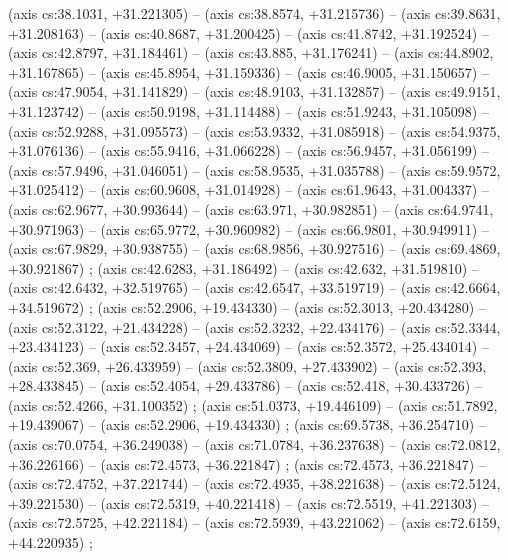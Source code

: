     (axis cs:38.1031,    +31.221305) --  (axis cs:38.8574,    +31.215736) --  (axis cs:39.8631,    +31.208163) --  (axis cs:40.8687,    +31.200425) --  (axis cs:41.8742,    +31.192524) --  (axis cs:42.8797,    +31.184461) --  (axis cs:43.885,    +31.176241) --  (axis cs:44.8902,    +31.167865) --  (axis cs:45.8954,    +31.159336) --  (axis cs:46.9005,    +31.150657) --  (axis cs:47.9054,    +31.141829) --  (axis cs:48.9103,    +31.132857) --  (axis cs:49.9151,    +31.123742) --  (axis cs:50.9198,    +31.114488) --  (axis cs:51.9243,    +31.105098) --  (axis cs:52.9288,    +31.095573) --  (axis cs:53.9332,    +31.085918) --  (axis cs:54.9375,    +31.076136) --  (axis cs:55.9416,    +31.066228) --  (axis cs:56.9457,    +31.056199) --  (axis cs:57.9496,    +31.046051) --  (axis cs:58.9535,    +31.035788) --  (axis cs:59.9572,    +31.025412) --  (axis cs:60.9608,    +31.014928) --  (axis cs:61.9643,    +31.004337) --  (axis cs:62.9677,    +30.993644) --  (axis cs:63.971,    +30.982851) --  (axis cs:64.9741,    +30.971963) --  (axis cs:65.9772,    +30.960982) --  (axis cs:66.9801,    +30.949911) --  (axis cs:67.9829,    +30.938755) --  (axis cs:68.9856,    +30.927516) --  (axis cs:69.4869,    +30.921867) ;
    (axis cs:42.6283,    +31.186492) --  (axis cs:42.632,    +31.519810) --  (axis cs:42.6432,    +32.519765) --  (axis cs:42.6547,    +33.519719) --  (axis cs:42.6664,    +34.519672) ;
    (axis cs:52.2906,    +19.434330) --  (axis cs:52.3013,    +20.434280) --  (axis cs:52.3122,    +21.434228) --  (axis cs:52.3232,    +22.434176) --  (axis cs:52.3344,    +23.434123) --  (axis cs:52.3457,    +24.434069) --  (axis cs:52.3572,    +25.434014) --  (axis cs:52.369,    +26.433959) --  (axis cs:52.3809,    +27.433902) --  (axis cs:52.393,    +28.433845) --  (axis cs:52.4054,    +29.433786) --  (axis cs:52.418,    +30.433726) --  (axis cs:52.4266,    +31.100352) ;
    (axis cs:51.0373,    +19.446109) --  (axis cs:51.7892,    +19.439067) --  (axis cs:52.2906,    +19.434330) ;
    (axis cs:69.5738,    +36.254710) --  (axis cs:70.0754,    +36.249038) --  (axis cs:71.0784,    +36.237638) --  (axis cs:72.0812,    +36.226166) --  (axis cs:72.4573,    +36.221847) ;
    (axis cs:72.4573,    +36.221847) --  (axis cs:72.4752,    +37.221744) --  (axis cs:72.4935,    +38.221638) --  (axis cs:72.5124,    +39.221530) --  (axis cs:72.5319,    +40.221418) --  (axis cs:72.5519,    +41.221303) --  (axis cs:72.5725,    +42.221184) --  (axis cs:72.5939,    +43.221062) --  (axis cs:72.6159,    +44.220935) ;
